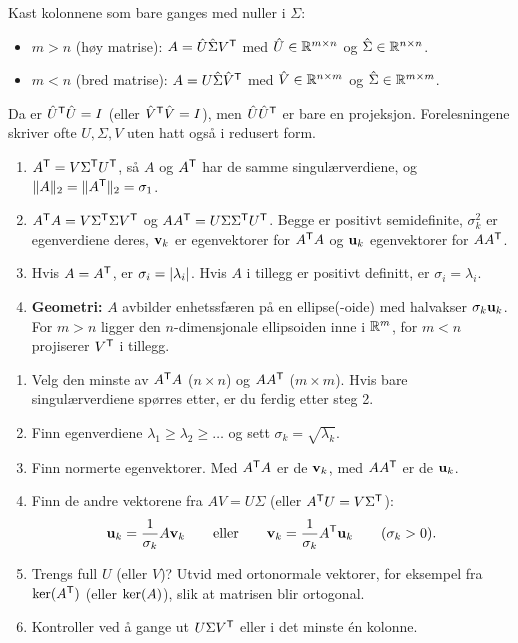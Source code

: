 \begin{defn}
Kast kolonnene som bare ganges med nuller i $\Sigma$:
\begin{itemize}
  \item $m>n$ (høy matrise): $A=\hat U\hat\Sigma V^{\mathsf{T}}$ med $\hat U\in\mathbb{R}^{m\times n}$ og $\hat\Sigma\in\mathbb{R}^{n\times n}$.
  \item $m<n$ (bred matrise): $A=U\hat\Sigma\hat V^{\mathsf{T}}$ med $\hat V\in\mathbb{R}^{n\times m}$ og $\hat\Sigma\in\mathbb{R}^{m\times m}$.
\end{itemize}
Da er $\hat U^{\mathsf{T}}\hat U=I$ (eller $\hat V^{\mathsf{T}}\hat V=I$), men $\hat U\hat U^{\mathsf{T}}$ er bare en projeksjon. Forelesningene skriver ofte $U,\Sigma,V$ uten hatt også i redusert form.
\end{defn}

\begin{teorem}[egenskaper]
\begin{enumerate}
  \item $A^{\mathsf{T}}=V\Sigma^{\mathsf{T}} U^{\mathsf{T}}$, så $A$ og $A^{\mathsf{T}}$ har de samme singulærverdiene, og $\lVert A\rVert_2=\lVert A^{\mathsf{T}}\rVert_2=\sigma_1$.
  \item $A^{\mathsf{T}} A=V\Sigma^{\mathsf{T}}\Sigma V^{\mathsf{T}}$ og $AA^{\mathsf{T}}=U\Sigma\Sigma^{\mathsf{T}} U^{\mathsf{T}}$. Begge er positivt semidefinite, $\sigma_k^2$ er egenverdiene deres, $\mathbf{v}_k$ er egenvektorer for $A^{\mathsf{T}} A$ og $\mathbf{u}_k$ egenvektorer for $AA^{\mathsf{T}}$.
  \item Hvis $A=A^{\mathsf{T}}$, er $\sigma_i=\lvert \lambda_i\rvert$. Hvis $A$ i tillegg er positivt definitt, er $\sigma_i=\lambda_i$.
  \item \textbf{Geometri:} $A$ avbilder enhetssfæren på en ellipse(-oide) med halvakser $\sigma_k\mathbf{u}_k$. For $m>n$ ligger den $n$-dimensjonale ellipsoiden inne i $\mathbb{R}^m$, for $m<n$ projiserer $V^{\mathsf{T}}$ i tillegg.
\end{enumerate}
\end{teorem}

\begin{oppskrift}
\begin{enumerate}
  \item Velg den minste av $A^{\mathsf{T}} A$ ($n\times n$) og $AA^{\mathsf{T}}$ ($m\times m$). Hvis bare singulærverdiene spørres etter, er du ferdig etter steg 2.
  \item Finn egenverdiene $\lambda_1\ge\lambda_2\ge\dots$ og sett $\sigma_k=\sqrt{\lambda_k}$.
  \item Finn normerte egenvektorer. Med $A^{\mathsf{T}} A$ er de $\mathbf{v}_k$, med $AA^{\mathsf{T}}$ er de $\mathbf{u}_k$.
  \item Finn de andre vektorene fra $AV=U\Sigma$ (eller $A^{\mathsf{T}} U=V\Sigma^{\mathsf{T}}$):
  \[
  \mathbf{u}_k=\frac{1}{\sigma_k}A\mathbf{v}_k\qquad\text{eller}\qquad \mathbf{v}_k=\frac{1}{\sigma_k}A^{\mathsf{T}}\mathbf{u}_k\qquad(\sigma_k>0).
  \]
  \item Trengs full $U$ (eller $V$)? Utvid med ortonormale vektorer, for eksempel fra $\operatorname{ker}(A^{\mathsf{T}})$ (eller $\operatorname{ker}(A)$), slik at matrisen blir ortogonal.
  \item Kontroller ved å gange ut $U\Sigma V^{\mathsf{T}}$ eller i det minste én kolonne.
\end{enumerate}
\end{oppskrift}

